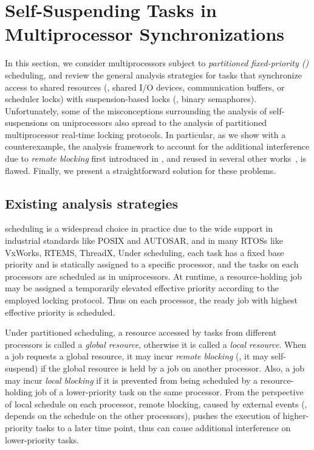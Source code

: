 \section{Self-Suspending Tasks in Multiprocessor Synchronizations}
\label{sec:syn}

In this section, we consider multiprocessors subject to \emph{partitioned fixed-priority (\pfp)} scheduling, and review the general analysis strategies for tasks that synchronize access to shared resources (\eg, shared I/O devices, communication buffers, or scheduler locks) with suspension-based locks (\eg, binary semaphores). Unfortunately, some of the misconceptions surrounding the analysis of self-suspensions on uniprocessors also spread to the analysis of partitioned multiprocessor real-time locking protocols. In particular, as we show with a counterexample, the analysis framework to account for the additional interference due to \emph{remote blocking} first introduced in \cite{lakshmanan-2009}, and reused in several other works~\cite{zeng-2011,bbb-2013,yang-2013,kim-2014,han-2014,carminati-2014,yang-2014},  is flawed. Finally, we present a straightforward solution for these problems. 

\subsection{Existing analysis strategies}
\label{sec:papers}

\pfp scheduling is a widespread choice in practice due to the wide support in industrial standards like POSIX and AUTOSAR, and in many RTOSs like VxWorks, RTEMS, ThreadX, \etc Under \pfp scheduling, each task has a fixed base priority and is statically assigned to a specific processor, and the tasks on each processors are scheduled as in uniprocessors. At runtime, a resource-holding job may be assigned a temporarily elevated effective priority according to the employed locking protocol. Thus on each processor, the ready job with highest effective priority is scheduled. 

Under partitioned scheduling, a resource accessed by tasks from different processors is called a \emph{global resource}, otherwise it is called a \emph{local resource}. When a job requests a global resource, it may incur \emph{remote blocking} (\ie, it may self-suspend) if the global resource is held by a job on another processor. Also, a job may incur \emph{local blocking} if it is prevented from being scheduled by a resource-holding job of a lower-priority task on the same processor. From the perspective of local schedule on each processor, remote blocking, caused by external events (\ie, depends on the schedule on the other processors), pushes the execution of higher-priority tasks to a later time point, thus can cause additional interference on lower-priority tasks. 

